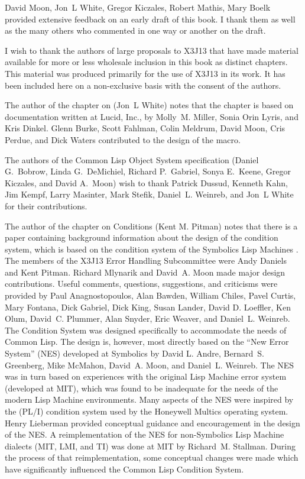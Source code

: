 David Moon, Jon~L White, Gregor Kiczales, Robert Mathis, Mary Boelk
provided extensive feedback on an early draft of this book.
I thank them as well as the many others who commented in one way
or another on the draft.

I wish to thank the authors of large proposals to X3J13
that have made material available for more or less wholesale
inclusion in this book as distinct chapters.
This material was produced primarily for the use of X3J13 in its work.
It has been included here
on a non-exclusive basis with the consent of the authors.

The author of the chapter on  (Jon~L White)
notes that the chapter is based on documentation
written at Lucid, Inc., by Molly~M. Miller,
Sonia Orin Lyris, and Kris Dinkel.
Glenn Burke, Scott Fahlman, Colin Meldrum,
David Moon, Cris Perdue, and Dick Waters
contributed to the design of the  macro.

The authors of the Common Lisp Object System specification
(Daniel G.~Bobrow, Linda G.~DeMichiel,
Richard P.~Gabriel, Sonya E.~Keene, Gregor Kiczales,
and David A.~Moon)
wish to thank Patrick Dussud, Kenneth Kahn,
Jim Kempf, Larry Masinter, Mark Stefik,
Daniel~L. Weinreb, and Jon~L White
for their contributions.

The author of the chapter on Conditions (Kent M. Pitman)
notes that there is a paper \cite{EXCEPTIONAL-SITUATIONS}
containing background information about the design of the
condition system, which is based on the condition system
of the Symbolics Lisp Machines \cite{SIGNALLING-CONDITIONS}.
The members of the X3J13 Error Handling Subcommittee
were
Andy Daniels and Kent Pitman.
Richard Mlynarik and David~A. Moon made major design contributions.
Useful comments, questions,
suggestions, and criticisms were provided by
    Paul Anagnostopoulos,
    Alan Bawden,
    William Chiles,
    Pavel Curtis,
    Mary Fontana,
    Dick Gabriel,
    Dick King,
    Susan Lander,
   David D. Loeffler,
 Ken Olum,
 David~C. Plummer,
 Alan Snyder,
   Eric Weaver, and
Daniel~L. Weinreb.
The Condition System was designed specifically to
accommodate the needs of Common Lisp.
The design is, however, most directly based on the ``New Error System''
(NES) developed at Symbolics by    David L. Andre,
    Bernard~S. Greenberg,
    Mike McMahon,
    David~A. Moon, and
    Daniel~L. Weinreb.
The NES was in turn based on experiences with the original Lisp
Machine error system (developed at MIT), which was found to be
inadequate for the needs of the modern Lisp Machine environments.
Many aspects of the NES were inspired by the (PL/I) condition
system used by the Honeywell Multics operating system. Henry Lieberman
provided
conceptual guidance and encouragement in the design of the NES.
A reimplementation of the NES for non-Symbolics Lisp Machine 
dialects (MIT, LMI, and TI) was done at MIT by Richard~M. Stallman.
During the process
of that reimplementation, some conceptual changes were made which
have significantly influenced the Common Lisp Condition System.

